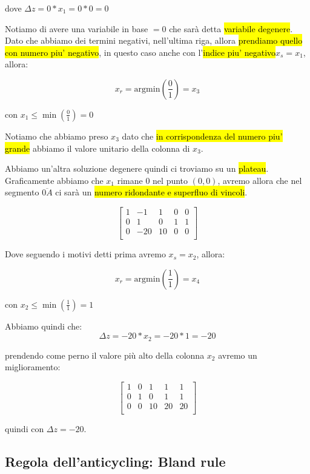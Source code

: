 dove $\Delta z = 0 * x_1 = 0 * 0 = 0$

Notiamo di avere una variabile in base $= 0$ che sarà detta \hl{variabile degenere}. Dato che abbiamo dei termini negativi, nell'ultima riga, allora \hl{prendiamo quello con numero piu' negativo}, in questo caso anche con l'\hl{indice piu' negativo}$x_s = x_1$, allora:

$$x_r = \text{argmin} (\frac{0}{1}) = x_3$$

con $x_1 \leq \min (\frac{0}{1}) = 0$

Notiamo che abbiamo preso $x_3$ dato che \hl{in corrispondenza del numero piu' grande} abbiamo il valore unitario della colonna di $x_3$. 

Abbiamo un'altra soluzione degenere quindi ci troviamo su un \hl{plateau}. Graficamente abbiamo che $x_1$ rimane 0 nel punto $(0,0)$, avremo allora che nel segmento $\overline{0A}$ ci sarà un \hl{numero ridondante e superfluo di vincoli}. 


$$
\left[ {\begin{array}{ccccc}
	1 & -1 & 1 & 0 & 0\\
	0 & 1 & 0 & 1 & 1\\
	0 & -20 & 10 & 0 & 0\\
\end{array} } \right]
$$


Dove seguendo i motivi detti prima avremo $x_s = x_2$, allora:

$$x_r = \text{argmin}(\frac{1}{1}) = x_4$$

con $x_2 \leq \min(\frac{1}{1}) = 1$

Abbiamo quindi che:
$$\Delta z = -20 * x_2 = -20 * 1 = -20$$

prendendo come perno il valore più alto della colonna $x_2$ avremo un miglioramento:


$$
\left[ {\begin{array}{ccccc}
	1 & 0 & 1 & 1 & 1\\
	0 & 1 & 0 & 1 & 1\\
	0 & 0 & 10 & 20 & 20\\
\end{array} } \right]
$$

quindi con $\Delta z = - 20$.


\subsection{Regola dell'anticycling: Bland rule}

